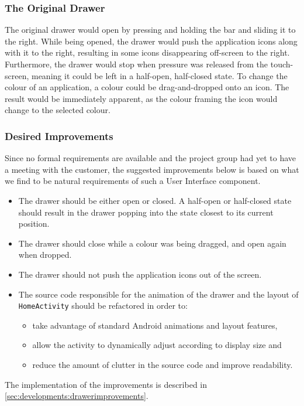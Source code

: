 \subsubsection{The Original Drawer}

The original drawer would open by pressing and holding the bar and sliding it to the right.
While being opened, the drawer would push the application icons along with it to the right, resulting in some icons disappearing off-screen to the right.
Furthermore, the drawer would stop when pressure was released from the touch-screen, meaning it could be left in a half-open, half-closed state.
To change the colour of an application, a colour could be drag-and-dropped onto an icon. 
The result would be immediately apparent, as the colour framing the icon would change to the selected colour.

\subsubsection{Desired Improvements}

Since no formal requirements are available and the project group had yet to have a meeting with the customer, the suggested improvements below is based on what we find to be natural requirements of such a User Interface component. 

\begin{itemize}
\item The drawer should be either open or closed. A half-open or half-closed state should result in the drawer popping into the state closest to its current position.
\item The drawer should close while a colour was being dragged, and open again when dropped.
\item The drawer should not push the application icons out of the screen.
\item The source code responsible for the animation of the drawer and the layout of \lstinline{HomeActivity} should be refactored in order to:
\begin{itemize}
\item take advantage of standard Android animations and layout features,
\item allow the activity to dynamically adjust according to display size and
\item reduce the amount of clutter in the source code and improve readability.
\end{itemize}
\end{itemize}

The implementation of the improvements is described in \cref{sec:developments:drawerimprovements}.